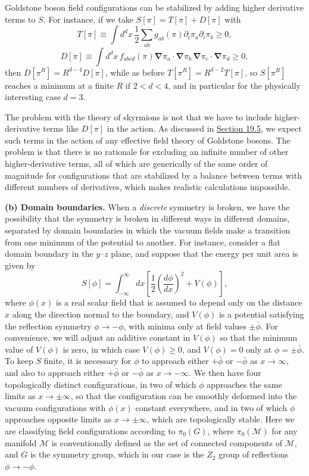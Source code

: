 Goldstone boson field configurations can be stabilized by adding higher
derivative terms to $S$. For instance, if we take
$S[\pi]=T[\pi]+D[\pi]$ with
\[
 T[\pi]\equiv\int d^d x\,\frac{1}{2}\sum_{ab}g_{ab}(\pi)
 \partial_i\pi_a\partial_i\pi_b\geq0,
\]
\[
 D[\pi]\equiv\int d^d x\,f_{abcd}(\pi)
 \boldsymbol{\nabla}\pi_a\cdot\boldsymbol{\nabla}\pi_b\,
 \boldsymbol{\nabla}\pi_c\cdot\boldsymbol{\nabla}\pi_d\geq0,
\]
then $D[\pi^R]=R^{d-4}D[\pi]$, while as before
$T[\pi^R]=R^{d-2}T[\pi]$, so $S[\pi^R]$ reaches a minimum at a finite $R$
if $2<d<4$, and in particular for the physically interesting case $d=3$.

The problem with the theory of skyrmions is not that we have to include
higher-derivative terms like $D[\pi]$ in the action. As discussed in
\hyperref[sec:19.5]{Section 19.5}, we expect such terms in the action of any
effective field theory of Goldstone bosons. The problem is that there is no
rationale for excluding an infinite number of other higher-derivative
terms, all of which are generically of the same order of magnitude for
configurations that are stabilized by a balance between terms with
different numbers of derivatives, which makes realistic calculations
impossible.

\noindent\textbf{(b) Domain boundaries.} When a \emph{discrete} symmetry is
broken, we have the possibility that the symmetry is broken in different
ways in different domains, separated by domain boundaries in which the
vacuum fields make a transition from one minimum of the potential to
another. For instance, consider a flat domain boundary in the $y$--$z$
plane, and suppose that the energy per unit area is given by
\begin{equation}
 S[\phi]=\int_{-\infty}^{\infty}dx\left[
  \frac{1}{2}\left(\frac{d\phi}{dx}\right)^2+V(\phi)
 \right],
 \tag{23.1.2}\label{eq:23.1.2}
\end{equation}
where $\phi(x)$ is a real scalar field that is assumed to depend only on the
distance $x$ along the direction normal to the boundary, and $V(\phi)$ is a
potential satisfying the reflection symmetry $\phi\to-\phi$, with minima
only at field values $\pm\bar\phi$. For convenience, we will adjust an
additive constant in $V(\phi)$ so that the minimum value of $V(\phi)$ is
zero, in which case $V(\phi)\geq0$, and $V(\phi)=0$ only at
$\phi=\pm\bar\phi$. To keep $S$ finite, it is necessary for $\phi$ to
approach either $+\bar\phi$ or $-\bar\phi$ as $x\to\infty$, and also to
approach either $+\bar\phi$ or $-\bar\phi$ as $x\to-\infty$. We then have
four topologically distinct configurations, in two of which $\phi$
approaches the same limits as $x\to\pm\infty$, so that the configuration
can be smoothly deformed into the vacuum configurations with $\phi(x)$
constant everywhere, and in two of which $\phi$ approaches opposite limits
as $x\to\pm\infty$, which are topologically stable. Here we are classifying
field configurations according to $\pi_0(G)$, where $\pi_0(\mathcal M)$ for
any manifold $\mathcal M$ is conventionally defined as the set of connected
components of $\mathcal M$, and $G$ is the symmetry group, which in our case
is the $Z_2$ group of reflections $\phi\to-\phi$.


